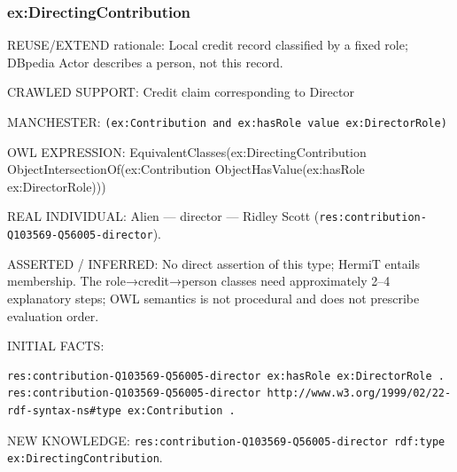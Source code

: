 \documentclass[
  11pt,
]{article}
\begin{document}
\subsubsection{\texorpdfstring{ex:\allowbreak{}\allowbreak{}Direc\allowbreak{}ting\allowbreak{}Cont\allowbreak{}ribution\allowbreak{}}{}}\label{exdirectingcontribution}

REUSE/EXTEND rationale: Local credit record classified by a fixed role;
DBpedia Actor describes a person, not this record.

CRAWLED SUPPORT: Credit claim correspo\allowbreak{}nding to Director

MANCHESTER:
\texttt{(ex:\allowbreak{}\allowbreak{}Cont\allowbreak{}ribution\allowbreak{} and ex:\allowbreak{}has\allowbreak{}Role \allowbreak{}value ex\allowbreak{}:\allowbreak{}\allowbreak{}Directo\allowbreak{}r\allowbreak{}Role)}

OWL EXPRESSION:
Equivale\allowbreak{}nt\allowbreak{}Classe\allowbreak{}s(ex:\allowbreak{}\allowbreak{}Dir\allowbreak{}ecting\allowbreak{}Co\allowbreak{}ntributi\allowbreak{}on
Object\allowbreak{}In\allowbreak{}tersecti\allowbreak{}on\allowbreak{}Of(ex:\allowbreak{}\allowbreak{}Contribu\allowbreak{}tion
Object\allowbreak{}Ha\allowbreak{}s\allowbreak{}Value(e\allowbreak{}x:\allowbreak{}has\allowbreak{}Rol\allowbreak{}e
ex:\allowbreak{}\allowbreak{}Direc\allowbreak{}tor\allowbreak{}Role)\allowbreak{}))

REAL INDIVIDUAL: Alien --- director --- Ridley Scott
(\texttt{res:\allowbreak{}cont\allowbreak{}ribution\allowbreak{}-\allowbreak{}\allowbreak{}Q103569\allowbreak{}-\allowbreak{}\allowbreak{}Q56005-\allowbreak{}director\allowbreak{}}).

ASSERTED / INFERRED: No direct assertion of this type; HermiT entails
membership. The role→credit→person classes need
approxim\allowbreak{}ately 2--4 explanatory steps; OWL semantics is not
procedural and does not prescribe evaluation order.

INITIAL FACTS:

\begin{verbatim}
res:contribution-Q103569-Q56005-director ex:hasRole ex:DirectorRole .
res:contribution-Q103569-Q56005-director http://www.w3.org/1999/02/22-rdf-syntax-ns#type ex:Contribution .
\end{verbatim}

NEW KNOWLEDGE:
\texttt{res:\allowbreak{}cont\allowbreak{}ribution\allowbreak{}-\allowbreak{}\allowbreak{}Q103569\allowbreak{}-\allowbreak{}\allowbreak{}Q56005-\allowbreak{}director\allowbreak{} rdf:\allowbreak{}typ\allowbreak{}e ex:\allowbreak{}\allowbreak{}Dir\allowbreak{}ecting\allowbreak{}Co\allowbreak{}ntributi\allowbreak{}on}.
\end{document}
